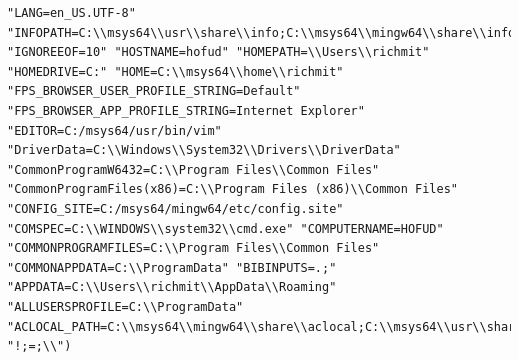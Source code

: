 \documentclass[11pt]{article}
\begin{document}
\begin{verbatim}
"LANG=en_US.UTF-8" "INFOPATH=C:\\msys64\\usr\\share\\info;C:\\msys64\\mingw64\\share\\info;C:\\msys64\\mingw32\\share\\info" "IGNOREEOF=10" "HOSTNAME=hofud" "HOMEPATH=\\Users\\richmit" "HOMEDRIVE=C:" "HOME=C:\\msys64\\home\\richmit" "FPS_BROWSER_USER_PROFILE_STRING=Default" "FPS_BROWSER_APP_PROFILE_STRING=Internet Explorer" "EDITOR=C:/msys64/usr/bin/vim" "DriverData=C:\\Windows\\System32\\Drivers\\DriverData" "CommonProgramW6432=C:\\Program Files\\Common Files" "CommonProgramFiles(x86)=C:\\Program Files (x86)\\Common Files" "CONFIG_SITE=C:/msys64/mingw64/etc/config.site" "COMSPEC=C:\\WINDOWS\\system32\\cmd.exe" "COMPUTERNAME=HOFUD" "COMMONPROGRAMFILES=C:\\Program Files\\Common Files" "COMMONAPPDATA=C:\\ProgramData" "BIBINPUTS=.;" "APPDATA=C:\\Users\\richmit\\AppData\\Roaming" "ALLUSERSPROFILE=C:\\ProgramData" "ACLOCAL_PATH=C:\\msys64\\mingw64\\share\\aclocal;C:\\msys64\\usr\\share\\aclocal" "!;=;\\")
\end{verbatim}
\end{document}

